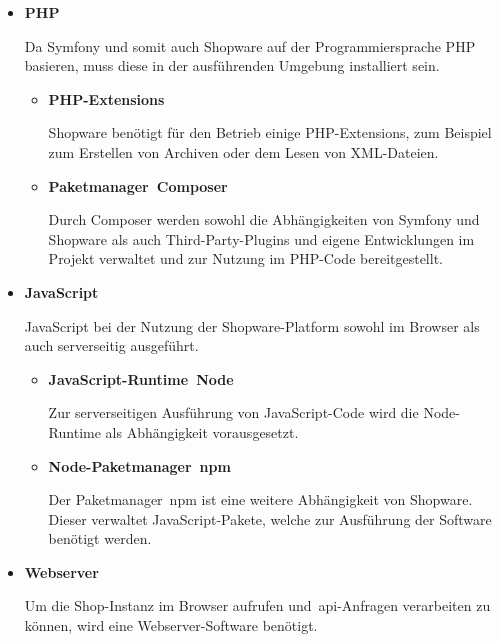 \begin{itemize}
    \item {
        \textbf{PHP}\par
        Da Symfony und somit auch Shopware auf der Programmiersprache PHP basieren, muss diese in der ausführenden
        Umgebung installiert sein.

        \begin{itemize}
            \item {
                \textbf{PHP-Extensions}\par
                Shopware benötigt für den Betrieb einige PHP-Extensions, zum Beispiel zum Erstellen von Archiven
                oder dem Lesen von XML-Dateien.
            }

            \item {
                \textbf{Paketmanager\ \glqq Composer\grqq}\par
                Durch Composer werden sowohl die Abhängigkeiten von Symfony und Shopware als auch Third-Party-Plugins
                und eigene Entwicklungen im Projekt verwaltet und zur Nutzung im PHP-Code bereitgestellt.
            }
        \end{itemize}
    }

    \item {
        \textbf{JavaScript}\par
        JavaScript bei der Nutzung der Shopware-Platform sowohl im Browser als auch serverseitig ausgeführt.

        \begin{itemize}
            \item {
                \textbf{JavaScript-Runtime\ \glqq Node\grqq}\par
                Zur serverseitigen Ausführung von JavaScript-Code wird die Node-Runtime als Abhängigkeit vorausgesetzt.
            }

            \item {
                \textbf{Node-Paketmanager\ \glqq\acrshort{npm}\grqq}\par
                Der Paketmanager\ \acrshort{npm} ist eine weitere Abhängigkeit von Shopware.
                Dieser verwaltet JavaScript-Pakete, welche zur Ausführung der Software benötigt werden.
            }
        \end{itemize}
    }

    \item {
        \textbf{Webserver}\par
        Um die Shop-Instanz im Browser aufrufen und\ \acrshort{api}-Anfragen verarbeiten zu können, wird eine
        Webserver-Software benötigt.
    }


\end{itemize}
